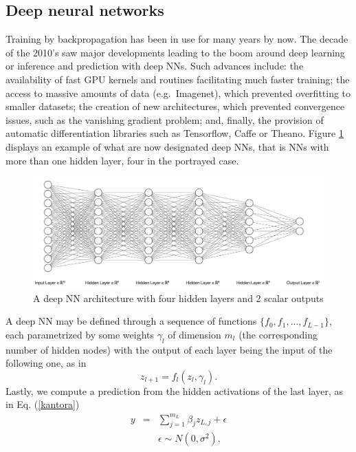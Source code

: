 \subsection{Deep neural networks}\label{sec:dnn_examples}

Training by backpropagation has been in use 
for many years by now.
The decade of the 2010's saw major developments
leading to 
the boom around deep learning \parencite{10.5555/3086952}
or inference and prediction with deep NNs. 
Such advances include:
the availability of fast GPU kernels and routines
facilitating much faster training;
the access to massive amounts of data (e.g.\ Imagenet), which prevented overfitting to smaller datasets; 
the creation of new architectures, which prevented  convergence issues, such as the vanishing gradient problem; 
and, finally, the provision of automatic differentiation libraries such as Tensorflow, Caffe or Theano.
Figure \ref{figuradkk} displays an example
of what are now designated 
deep NNs, that is NNs with more than one hidden
layer, four in the portrayed case.
\begin{figure}
    \centering
    \includegraphics[scale=0.35]{figures/net2.png}
    \caption{A deep NN architecture with four hidden layers and 2 scalar outputs}
    \label{figuradkk}
\end{figure}


A deep NN may be defined through   
a sequence of functions $\lbrace f_0, f_1, ..., f_{L-1} \rbrace$, each parametrized by some weights $\gamma_l$
of dimension $m_l$  (the corresponding number of hidden nodes) with the output of each layer being the input of the following one, as in
$$
    z_{l+1} = f_l ( z_l, \gamma_l).
$$
Lastly, we compute a prediction from the hidden activations of the last layer, as in Eq. (\ref{kantora})
\begin{eqnarray}
y         & = & \sum_{j=1}^{m_L} \beta_j z_{L,j} +
                    \epsilon %
                    \nonumber\\
              & & \epsilon \sim N(0,\sigma^2),
                  \nonumber \\
\end{eqnarray}

